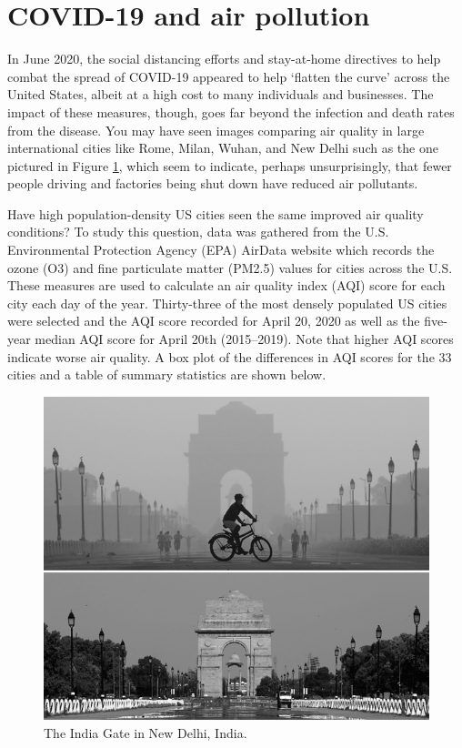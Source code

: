 \documentclass[
]{report}
\begin{document}
\hypertarget{covid-19-and-air-pollution}{%
\section{COVID-19 and air pollution}\label{covid-19-and-air-pollution}}

In June 2020, the social distancing efforts and stay-at-home directives to help combat the spread of COVID-19 appeared to help `flatten the curve' across the United States, albeit at a high cost to many individuals and businesses. The impact of these measures, though, goes far beyond the infection and death rates from the disease. You may have seen images comparing air quality in large international cities like Rome, Milan, Wuhan, and New Delhi such as the one pictured in Figure \ref{fig:covid}, which seem to indicate, perhaps unsurprisingly, that fewer people driving and factories being shut down have reduced air pollutants.

Have high population-density US cities seen the same improved air quality conditions? To study this question, data was gathered from the U.S. Environmental Protection Agency (EPA) AirData website which records the ozone (O3) and fine particulate matter (PM2.5) values for cities across the U.S. These measures are used to calculate an air quality index (AQI) score for each city each day of the year. Thirty-three of the most densely populated US cities were selected and the AQI score recorded for April 20, 2020 as well as the five-year median AQI score for April 20th (2015--2019). Note that higher AQI scores indicate worse air quality. A box plot of the differences in AQI scores for the 33 cities and a table of summary statistics are shown below.

\begin{figure}

{\centering \includegraphics[width=0.6\linewidth]{images/air_pollution_greyscale} 

}

\caption{The India Gate in New Delhi, India.}\label{fig:covid}
\end{figure}
\end{document}
